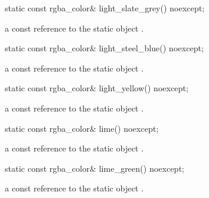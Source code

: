 \begin{itemdecl}
    static const rgba_color& light_slate_grey() noexcept;
\end{itemdecl}
\begin{itemdescr}
    \pnum
    \returns
    a const reference to the static  object .
\end{itemdescr}

\begin{itemdecl}
    static const rgba_color& light_steel_blue() noexcept;
\end{itemdecl}
\begin{itemdescr}
    \pnum
    \returns
    a const reference to the static  object .
\end{itemdescr}

\begin{itemdecl}
    static const rgba_color& light_yellow() noexcept;
\end{itemdecl}
\begin{itemdescr}
    \pnum
    \returns
    a const reference to the static  object .
\end{itemdescr}

\begin{itemdecl}
    static const rgba_color& lime() noexcept;
\end{itemdecl}
\begin{itemdescr}
    \pnum
    \returns
    a const reference to the static  object .
\end{itemdescr}

\begin{itemdecl}
    static const rgba_color& lime_green() noexcept;
\end{itemdecl}
\begin{itemdescr}
    \pnum
    \returns
    a const reference to the static  object .
\end{itemdescr}

